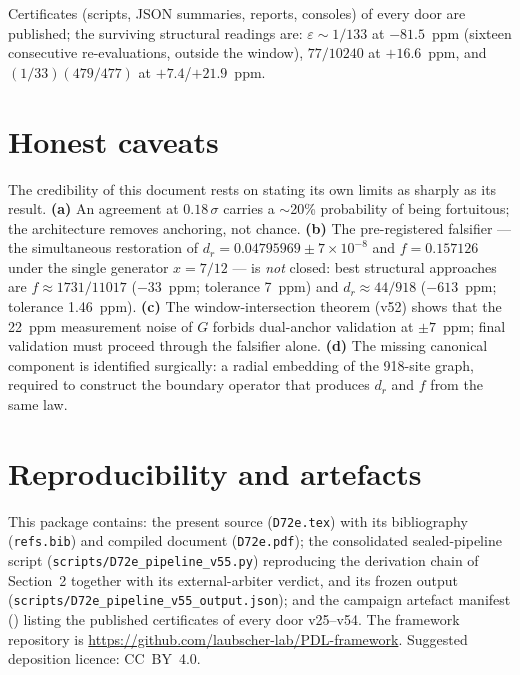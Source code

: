 \documentclass[11pt,a4paper]{article}
\begin{document}
Certificates (scripts, JSON summaries, reports, consoles) of every door are published; the surviving structural readings are: $\varepsilon \sim 1/133$ at $-81.5$~ppm (sixteen consecutive re-evaluations, outside the window), $77/10240$ at $+16.6$~ppm, and $(1/33)(479/477)$ at $+7.4$/$+21.9$~ppm.

\section{Honest caveats}
The credibility of this document rests on stating its own limits as sharply as its result.
\textbf{(a)} An agreement at $0.18\,\sigma$ carries a $\sim$20\% probability of being fortuitous; the architecture removes anchoring, not chance.
\textbf{(b)} The pre-registered falsifier --- the simultaneous restoration of $d_r = 0.04795969 \pm 7\times10^{-8}$ and $f = 0.157126$ under the single generator $x = 7/12$ --- is \emph{not} closed: best structural approaches are $f \approx 1731/11017$ ($-33$~ppm; tolerance 7~ppm) and $d_r \approx 44/918$ ($-613$~ppm; tolerance 1.46~ppm).
\textbf{(c)} The window-intersection theorem (v52) shows that the 22~ppm measurement noise of $G$ forbids dual-anchor validation at $\pm7$~ppm; final validation must proceed through the falsifier alone.
\textbf{(d)} The missing canonical component is identified surgically: a radial embedding of the 918-site graph, required to construct the boundary operator that produces $d_r$ and $f$ from the same law.

\section{Reproducibility and artefacts}
This package contains: the present source (\texttt{D72e.tex}) with its bibliography (\texttt{refs.bib}) and compiled document (\texttt{D72e.pdf}); the consolidated sealed-pipeline script (\texttt{scripts/}\allowbreak\texttt{D72e\allowbreak\_\allowbreak pipeline\allowbreak\_\allowbreak v55\allowbreak.\allowbreak py}) reproducing the derivation chain of Section~2 together with its external-arbiter verdict, and its frozen output (\texttt{scripts/}\allowbreak\texttt{D72e\allowbreak\_\allowbreak pipeline\allowbreak\_\allowbreak v55\allowbreak\_\allowbreak output\allowbreak.\allowbreak json}); and the campaign artefact manifest () listing the published certificates of every door v25--v54. The framework repository is \url{https://github.com/laubscher-lab/PDL-framework}. Suggested deposition licence: CC~BY~4.0.
\end{document}
